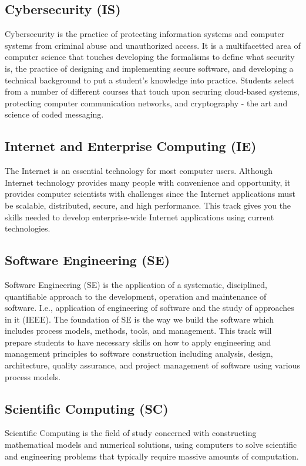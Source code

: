 \documentclass{book}
\newcommand{\IeTrackName}{Internet and Enterprise Computing (IE)}
\newcommand{\IsTrackName}{Cybersecurity (IS)}
\newcommand{\ScTrackName}{Scientific Computing (SC)}
\newcommand{\SeTrackName}{Software Engineering (SE)}
\begin{document}
\subsection{\IsTrackName}
\IsTrackIndex
Cybersecurity is the practice of protecting information systems and computer systems from criminal abuse and unauthorized access. It is a multifacetted area of computer science that touches developing the formalisms to define what security is, the practice of designing and implementing secure software, and developing a technical background to put a student's knowledge into practice. Students select from a number of different courses that touch upon securing cloud-based systems, protecting computer communication networks, and cryptography - the art and science of coded messaging.

\subsection{\IeTrackName}
\IeTrackIndex
The Internet is an essential technology for most computer users. Although Internet technology provides many people with convenience and opportunity, it provides computer scientists with challenges since the Internet applications must be scalable, distributed, secure, and high performance. This track gives you the skills needed to develop enterprise-wide Internet applications using current technologies.

\subsection{\SeTrackName}
\SeTrackIndex
Software Engineering (SE) is the application of a systematic, disciplined, quantifiable approach to the development, operation and maintenance of software. I.e., application of engineering of software and the study of approaches in it (IEEE).  The foundation of SE is the way we build the software which includes process models, methods, tools, and management.  This track will prepare students to have necessary skills on how to apply engineering and management principles to software construction including analysis, design, architecture, quality assurance, and project management of software using various process models.

\subsection{\ScTrackName}
\ScTrackIndex

Scientific Computing is the field of study concerned with constructing mathematical models and numerical solutions, using computers to solve scientific and engineering problems that typically require massive amounts of computation.
\end{document}
